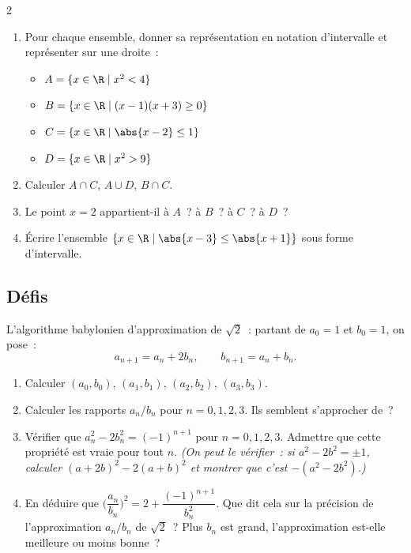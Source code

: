 \begin{probleme}{2}
\begin{enumerate}
  \item Pour chaque ensemble, donner sa repr\'esentation en notation d'intervalle
        et repr\'esenter sur une droite~:
        \begin{itemize}
          \item $A = \{x \in \R \mid x^2 < 4\}$
          \item $B = \{x \in \R \mid (x-1)(x+3) \geq 0\}$
          \item $C = \{x \in \R \mid \abs{x-2} \leq 1\}$
          \item $D = \{x \in \R \mid x^2 > 9\}$
        \end{itemize}
  \item Calculer $A \cap C$, $A \cup D$, $B \cap C$.
  \item Le point $x = 2$ appartient-il \`a $A$~? \`a $B$~? \`a $C$~? \`a $D$~?
  \item \'Ecrire l'ensemble $\{x \in \R \mid \abs{x-3} \leq \abs{x+1}\}$
        sous forme d'intervalle.
\end{enumerate}
\end{probleme}

\subsection*{D\'efis}

\begin{challenge}
L'algorithme babylonien d'approximation de $\sqrt{2}$~:
partant de $a_0 = 1$ et $b_0 = 1$, on pose~:
$$a_{n+1} = a_n + 2b_n, \qquad b_{n+1} = a_n + b_n.$$
\begin{enumerate}
  \item Calculer $(a_0,b_0),\,(a_1,b_1),\,(a_2,b_2),\,(a_3,b_3)$.
  \item Calculer les rapports $a_n/b_n$ pour $n=0,1,2,3$.
        Ils semblent s'approcher de~?
  \item V\'erifier que $a_n^2 - 2b_n^2 = (-1)^{n+1}$ pour $n=0,1,2,3$.
        Admettre que cette propri\'et\'e est vraie pour tout $n$.
        \emph{(On peut le v\'erifier~: si $a^2-2b^2=\pm1$, calculer
        $(a+2b)^2 - 2(a+b)^2$ et montrer que c'est $-(a^2-2b^2)$.)}
  \item En d\'eduire que $\bigl(\dfrac{a_n}{b_n}\bigr)^2 = 2 + \dfrac{(-1)^{n+1}}{b_n^2}$.
        Que dit cela sur la pr\'ecision de l'approximation $a_n/b_n$ de $\sqrt{2}$~?
        Plus $b_n$ est grand, l'approximation est-elle meilleure ou moins bonne~?
\end{enumerate}
\end{challenge}

